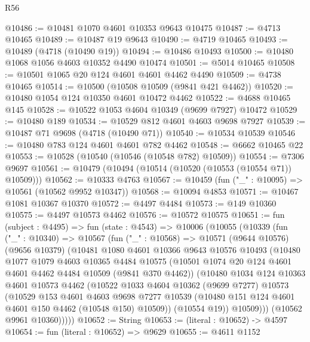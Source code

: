 \begin{lexlean}{R56}
\begin{coremodule}
@10486 := @10481 @1070 @4601 @10353 @9643 @10475
@10487 := @4713 @10465
@10489 := @10487 @19 @9643
@10490 := @4719 @10465
@10493 := @10489 (@4718 (@10490 @19))
@10494 := @10486 @10493
@10500 := @10480 @1068 @1056 @4603 @10352 @4490 @10474
@10501 := @5014 @10465
@10508 := @10501 @1065 @20 @124 @4601 @4601 @4462 @4490
@10509 := @4738 @10465
@10514 := @10500 (@10508 @10509 (@9841 @421 @4462))
@10520 := @10480 @1054 @124 @10350 @4601 @10472 @4462
@10522 := @4688 @10465 @145
@10528 := @10522 @1053 @4604 @10349 (@9699 @7927) @10472
@10529 := @10480 @189
@10534 := @10529 @812 @4601 @4603 @9698 @7927
@10539 := @10487 @71 @9698 (@4718 (@10490 @71))
@10540 := @10534 @10539
@10546 := @10480 @783 @124 @4601 @4601 @782 @4462
@10548 := @6662 @10465 @22
@10553 := @10528 (@10540 (@10546 (@10548 @782) @10509))
@10554 := @7306 @9697
@10561 := @10479 (@10494 (@10514 (@10520 (@10553 (@10554 @71)) @10509)))
@10562 := @10333 @4763
@10567 := @10459 (fun ("_" : @10095) => @10561 (@10562 @9952 @10347))
@10568 := @10094 @4853
@10571 := @10467 @1081 @10367 @10370
@10572 := @4497 @4484
@10573 := @149 @10360
@10575 := @4497 @10573 @4462
@10576 := @10572 @10575
@10651 := fun (subject : @4495) =>
  fun (state : @4543) =>
  @10006
    (@10055
      (@10339
        (fun ("_" : @10340) =>
        @10567
          (fun ("_" : @10568) =>
          @10571
            (@9644 @10576)
            (@9656 @10379)
            (@10481
              @1080
              @4601
              @10366
              @9643
              @10576
              @10493
              (@10480
                @1077
                @1079
                @4603
                @10365
                @4484
                @10575
                (@10501 @1074 @20 @124 @4601 @4601 @4462 @4484 @10509 (@9841 @370 @4462))
                (@10480
                  @1034
                  @124
                  @10363
                  @4601
                  @10573
                  @4462
                  (@10522
                    @1033
                    @4604
                    @10362
                    (@9699 @7277)
                    @10573
                    (@10529
                      @153
                      @4601
                      @4603
                      @9698
                      @7277
                      @10539
                      (@10480 @151 @124 @4601 @4601 @150 @4462 (@10548 @150) @10509))
                    (@10554 @19))
                  @10509)))
            (@10562 @9961 @10360)))))
@10652 := String
@10653 := (literal : @10652) -> @4597
@10654 := fun (literal : @10652) => @9629
@10655 := @4611 @1152

\end{coremodule}
\end{lexlean}
